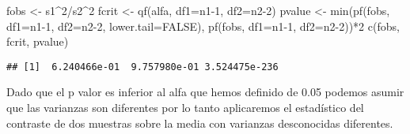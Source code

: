 \documentclass[
  a4paper]{article}
\newenvironment{Shaded}{\begin{snugshade}}{\end{snugshade}}
\newcommand{\AttributeTok}[1]{\textcolor[rgb]{0.77,0.63,0.00}{#1}}
\newcommand{\ConstantTok}[1]{\textcolor[rgb]{0.00,0.00,0.00}{#1}}
\newcommand{\DecValTok}[1]{\textcolor[rgb]{0.00,0.00,0.81}{#1}}
\newcommand{\FunctionTok}[1]{\textcolor[rgb]{0.00,0.00,0.00}{#1}}
\newcommand{\NormalTok}[1]{#1}
\newcommand{\OtherTok}[1]{\textcolor[rgb]{0.56,0.35,0.01}{#1}}
\newcommand{\SpecialCharTok}[1]{\textcolor[rgb]{0.00,0.00,0.00}{#1}}
\begin{document}
\begin{Shaded}
\begin{Highlighting}[]
\NormalTok{fobs }\OtherTok{\textless{}{-}}\NormalTok{ s1}\SpecialCharTok{\^{}}\DecValTok{2}\SpecialCharTok{/}\NormalTok{s2}\SpecialCharTok{\^{}}\DecValTok{2}
\NormalTok{fcrit }\OtherTok{\textless{}{-}} \FunctionTok{qf}\NormalTok{(alfa, }\AttributeTok{df1=}\NormalTok{n1}\DecValTok{{-}1}\NormalTok{, }\AttributeTok{df2=}\NormalTok{n2}\DecValTok{{-}2}\NormalTok{)}
\NormalTok{pvalue }\OtherTok{\textless{}{-}} \FunctionTok{min}\NormalTok{(}\FunctionTok{pf}\NormalTok{(fobs, }\AttributeTok{df1=}\NormalTok{n1}\DecValTok{{-}1}\NormalTok{, }\AttributeTok{df2=}\NormalTok{n2}\DecValTok{{-}2}\NormalTok{, }\AttributeTok{lower.tail=}\ConstantTok{FALSE}\NormalTok{), }\FunctionTok{pf}\NormalTok{(fobs, }\AttributeTok{df1=}\NormalTok{n1}\DecValTok{{-}1}\NormalTok{, }\AttributeTok{df2=}\NormalTok{n2}\DecValTok{{-}2}\NormalTok{))}\SpecialCharTok{*}\DecValTok{2}
\FunctionTok{c}\NormalTok{(fobs, fcrit, pvalue)}
\end{Highlighting}
\end{Shaded}

\begin{verbatim}
## [1]  6.240466e-01  9.757980e-01 3.524475e-236
\end{verbatim}

Dado que el p valor es inferior al alfa que hemos definido de 0.05
podemos asumir que las varianzas son diferentes por lo tanto aplicaremos
el estadístico del contraste de dos muestras sobre la media con
varianzas desconocidas diferentes.
\end{document}
